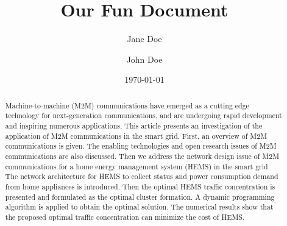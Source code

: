 \documentclass[11pt, a4paper]{report}
\begin{document}
\title{Our Fun Document}
\author{Jane Doe \and John Doe} 
\date{\today}
\maketitle
\begin{abstract}
Machine-to-machine (M2M) communications
have emerged as a cutting edge technology for next-generation communications, and are undergoing rapid development and inspiring numerous applications. This article presents an investigation of the application of M2M communications in the smart grid. First, an overview of M2M communications is given. The enabling technologies and open research issues of M2M communications are also discussed. Then we address the network design issue of M2M communications for a home energy management system (HEMS) in the smart grid. The network architecture for HEMS to collect status and power consumption demand from home appliances is introduced. Then the optimal HEMS traffic concentration is presented and formulated as the optimal cluster formation. A dynamic programming
algorithm is applied to obtain the optimal solution. The numerical results show that the proposed optimal traffic concentration
can minimize the cost of HEMS.
\end{abstract}
\end{document}
